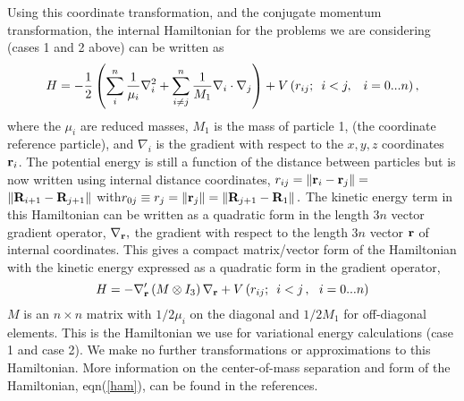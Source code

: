 Using this coordinate transformation, and the conjugate momentum
transformation, the internal Hamiltonian for the problems we are considering
(cases 1 and 2 above) can be written as 
\begin{equation}
H=-\frac 12\left( \sum_i^n\frac 1{\mu _i}\nabla _i^2+\sum_{i\neq j}^n\frac 1{%
M_1}\nabla _i\cdot \nabla _j\right) +V\left(
r_{ij};\,\,\,i<j,\,\,\,\,\,i=0...n\right) ,  \label{intham1}
\end{equation}
where the $\mu _i$ are reduced masses, $M_1$ is the mass of particle 1, (the
coordinate reference particle), and $\nabla _i$ is the gradient with respect
to the $x,y,z$ coordinates ${\bf r}_i$. The potential energy is still a
function of the distance between particles but is now written using internal
distance coordinates, $r_{ij}=\left\| {\bf r}_i-{\bf r}_j\right\| =$ $%
\left\| {\bf R}_{i+1}-{\bf R}_{j+1}\right\| \,\,$with\thinspace $%
r_{0j}\equiv r_j=\left\| {\bf r}_j\right\| =\left\| {\bf R}_{j+1}-{\bf R}%
_1\right\| .$ The kinetic energy term in this Hamiltonian can be written as
a quadratic form in the length $3n$ vector gradient operator, $\nabla _{{\bf %
r}},$ the gradient with respect to the length $3n$ vector ${\bf r}$ of
internal coordinates. This gives a compact matrix/vector form of the
Hamiltonian with the kinetic energy expressed as a quadratic form in the
gradient operator, 
\begin{equation}
H=-\nabla _{{\bf r}}^{\prime }\left( M\otimes I_3\right) \nabla _{{\bf r}%
}+V\left( r_{ij};\,\,\,i<j\,,\,\,\,\,i=0...n\right)  \label{ham}
\end{equation}
$M$ is an $n\times n$ matrix with $1/2\mu _i$ on the diagonal and $1/2M_1$
for off-diagonal elements. This is the Hamiltonian we use for variational
energy calculations (case 1 and case 2). We make no further transformations
or approximations to this Hamiltonian. More information on the
center-of-mass separation and form of the Hamiltonian, eqn(\ref{ham}), can
be found in the references\cite{Kinghorn93,Kinghorn95b}.

